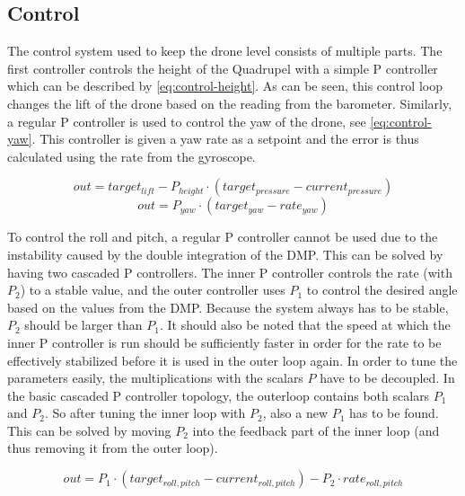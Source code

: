 \documentclass[final]{article}
\begin{document}
\subsection{Control}
The control system used to keep the drone level consists of multiple parts.
The first controller controls the height of the Quadrupel with a simple P controller which can be described by \autoref{eq:control-height}.
As can be seen, this control loop changes the lift of the drone based on the reading from the barometer.
Similarly, a regular P controller is used to control the yaw of the drone, see \autoref{eq:control-yaw}.
This controller is given a yaw rate as a setpoint and the error is thus calculated using the rate from the gyroscope.

\begin{equation}
out = target_{lift} - P_{height} \cdot (target_{pressure} - current_{pressure})
\label{eq:control-height}
\end{equation}
\begin{equation}
out = P_{yaw} \cdot (target_{yaw} - rate_{yaw})
\label{eq:control-yaw}
\end{equation}

To control the roll and pitch, a regular P controller cannot be used due to the instability caused by the double integration of the DMP.
This can be solved by having two cascaded P controllers.
The inner P controller controls the rate (with $P_2$) to a stable value, and the outer controller uses $P_1$ to control the desired angle based on the values from the DMP.
Because the system always has to be stable, $P_2$ should be larger than $P_1$.
It should also be noted that the speed at which the inner P controller is run should be sufficiently faster in order for the rate to be effectively stabilized before it is used in the outer loop again.
In order to tune the parameters easily, the multiplications with the scalars $P$ have to be decoupled.
In the basic cascaded P controller topology, the outerloop contains both scalars $P_1$ and $P_2$.
So after tuning the inner loop with $P_2$, also a new $P_1$ has to be found.
This can be solved by moving $P_2$ into the feedback part of the inner loop (and thus removing it from the outer loop).

\begin{equation}
out = P_1 \cdot (target_{roll,pitch} - current_{roll,pitch}) - P_2 \cdot rate_{roll,pitch}
\label{eq:control-roll-pitch}
\end{equation}
\end{document}
